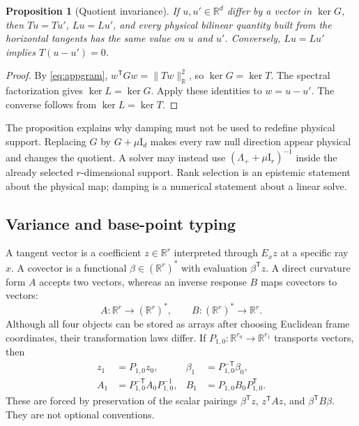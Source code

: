 \documentclass[10pt,twocolumn]{article}
\newtheorem{proposition}[theorem]{Proposition}
\theoremstyle{definition}
\theoremstyle{remark}
\newcommand{\R}{\mathbb R}
\newcommand{\Id}{\mathrm I}
\begin{document}
\begin{proposition}[Quotient invariance]
\label{prop:quotientinvariance}
If $u,u'\in\R^d$ differ by a vector in $\ker G$, then
$Tu=Tu'$, $Lu=Lu'$, and every physical bilinear quantity built from the
horizontal tangents has the same value on $u$ and $u'$.  Conversely, $Lu=Lu'$
implies $T(u-u')=0$.
\end{proposition}
\begin{proof}
By \eqref{eq:appgram}, $w^{\mathsf T}Gw=\|Tw\|_\R^2$, so
$\ker G=\ker T$.  The spectral factorization gives
$\ker L=\ker G$.  Apply these identities to $w=u-u'$.  The converse follows
from $\ker L=\ker T$.
\end{proof}

The proposition explains why damping must not be used to redefine physical
support.  Replacing $G$ by $G+\mu\Id_d$ makes every raw null direction appear
physical and changes the quotient.  A solver may instead use
$(\Lambda_++\mu\Id_r)^{-1}$ inside the already selected $r$-dimensional
support.  Rank selection is an epistemic statement about the physical map;
damping is a numerical statement about a linear solve.

\subsection{Variance and base-point typing}

A tangent vector is a coefficient $z\in\R^r$ interpreted through $E_xz$ at a
specific ray $x$.  A covector is a functional
$\beta\in(\R^r)^*$ with evaluation $\beta^{\mathsf T}z$.  A direct curvature
form $A$ accepts two vectors, whereas an inverse response $B$ maps covectors
to vectors:
\begin{equation}
 A:\R^r\to(\R^r)^*,\qquad
 B:(\R^r)^*\to\R^r .
 \label{eq:appvariance}
\end{equation}
Although all four objects can be stored as arrays after choosing Euclidean
frame coordinates, their transformation laws differ.  If
$P_{1,0}:\R^{r_0}\to\R^{r_1}$ transports vectors, then
\begin{align}
 z_1&=P_{1,0}z_0,&
 \beta_1&=P_{1,0}^{-\mathsf T}\beta_0,\nonumber\\
 A_1&=P_{1,0}^{-\mathsf T}A_0P_{1,0}^{-1},&
 B_1&=P_{1,0}B_0P_{1,0}^{\mathsf T}.
 \label{eq:appvariance-laws}
\end{align}
These are forced by preservation of the scalar pairings
$\beta^{\mathsf T}z$, $z^{\mathsf T}Az$, and
$\beta^{\mathsf T}B\beta$.  They are not optional conventions.
\end{document}
